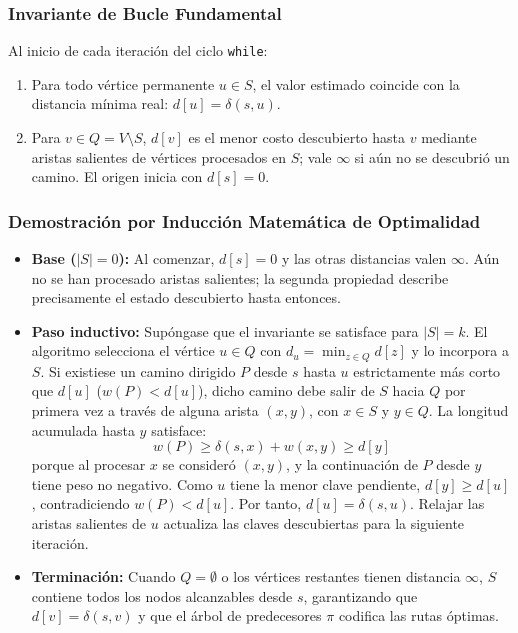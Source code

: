 \subsubsection{Invariante de Bucle Fundamental}
Al inicio de cada iteración del ciclo \texttt{while}:
\begin{enumerate}
    \item Para todo vértice permanente $u \in S$, el valor estimado coincide con la distancia mínima real: $d[u] = \delta(s, u)$.
    \item Para $v\in Q=V\setminus S$, $d[v]$ es el menor costo descubierto hasta $v$ mediante aristas salientes de vértices procesados en $S$; vale $\infty$ si aún no se descubrió un camino. El origen inicia con $d[s]=0$.
\end{enumerate}

\subsubsection{Demostración por Inducción Matemática de Optimalidad}
\begin{itemize}
    \item \textbf{Base ($|S|=0$):} Al comenzar, $d[s]=0$ y las otras distancias valen $\infty$. Aún no se han procesado aristas salientes; la segunda propiedad describe precisamente el estado descubierto hasta entonces.
    \item \textbf{Paso inductivo:} Supóngase que el invariante se satisface para $|S| = k$. El algoritmo selecciona el vértice $u \in Q$ con $d_u = \min_{z \in Q} d[z]$ y lo incorpora a $S$. Si existiese un camino dirigido $P$ desde $s$ hasta $u$ estrictamente más corto que $d[u]$ ($w(P) < d[u]$), dicho camino debe salir de $S$ hacia $Q$ por primera vez a través de alguna arista $(x, y)$, con $x \in S$ y $y \in Q$. La longitud acumulada hasta $y$ satisface:
    \begin{equation}
        w(P) \ge \delta(s, x) + w(x, y) \ge d[y]
    \end{equation}
    porque al procesar $x$ se consideró $(x,y)$, y la continuación de $P$ desde $y$ tiene peso no negativo. Como $u$ tiene la menor clave pendiente, $d[y]\ge d[u]$, contradiciendo $w(P)<d[u]$. Por tanto, $d[u]=\delta(s,u)$. Relajar las aristas salientes de $u$ actualiza las claves descubiertas para la siguiente iteración.
    \item \textbf{Terminación:} Cuando $Q = \emptyset$ o los vértices restantes tienen distancia $\infty$, $S$ contiene todos los nodos alcanzables desde $s$, garantizando que $d[v] = \delta(s, v)$ y que el árbol de predecesores $\pi$ codifica las rutas óptimas.
\end{itemize}

